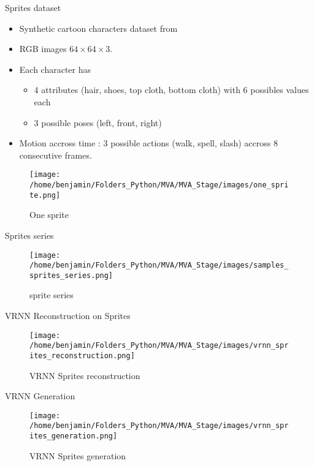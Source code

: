 \begin{frame}{Sprites dataset}
    \begin{itemize}
        \item Synthetic cartoon characters dataset from \cite{li_disentangled_2018}
        \item RGB images $64 \times 64 \times 3$. 
        \item Each character has 
        \begin{itemize}
            \item 4 attributes (hair, shoes, top cloth, bottom cloth) with 6 possibles values each
            \item 3 possible poses (left, front, right) 
        \end{itemize}
        \item Motion accross time : 3 possible actions (walk, spell, slash) accross 8 consecutive frames.
    \end{itemize}
    \begin{figure}[H]
        \centering
        \texttt{[image: /home/benjamin/Folders\_Python/MVA/MVA\_Stage/images/one\_sprite.png]}
        \caption{One sprite}
        \label{fig:One sprite}
    \end{figure}
\end{frame}
\begin{frame}{Sprites series}
    \begin{figure}[H]
        \centering
        \texttt{[image: /home/benjamin/Folders\_Python/MVA/MVA\_Stage/images/samples\_sprites\_series.png]}
        \caption{sprite series}
        \label{fig:sprite series}
    \end{figure}
\end{frame}

\begin{frame}{VRNN Reconstruction on Sprites}
    \begin{figure}[H]
    \centering
    \texttt{[image: /home/benjamin/Folders\_Python/MVA/MVA\_Stage/images/vrnn\_sprites\_reconstruction.png]}
    \caption{VRNN Sprites reconstruction}
    \label{fig:VRNN Sprites reconstruction}
\end{figure}
\end{frame}

\begin{frame}{VRNN Generation}
    \begin{figure}[H]
        \centering
        \texttt{[image: /home/benjamin/Folders\_Python/MVA/MVA\_Stage/images/vrnn\_sprites\_generation.png]}
        \caption{VRNN Sprites generation}
        \label{fig:sprite generation}
    \end{figure}
\end{frame}



